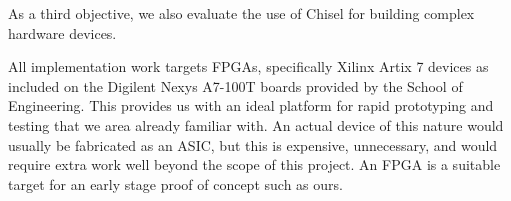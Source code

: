 As a third objective, we also evaluate the use of Chisel for building complex hardware devices.

All implementation work targets FPGAs, specifically Xilinx Artix 7 devices as included on the Digilent Nexys A7-100T boards provided by the School of Engineering. This provides us with an ideal platform for rapid prototyping and testing that we area already familiar with. An actual device of this nature would usually be fabricated as an ASIC, but this is expensive, unnecessary, and would require extra work well beyond the scope of this project. An FPGA is a suitable target for an early stage proof of concept such as ours.

